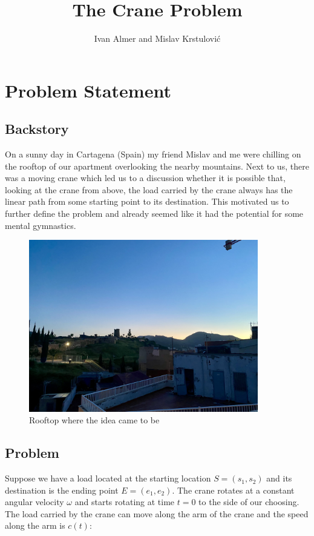 \documentclass[11pt]{article}
\begin{document}
\title{The Crane Problem}
\author{Ivan Almer and Mislav Krstulović}

\maketitle

\section{Problem Statement}

\subsection{Backstory}
On a sunny day in Cartagena (Spain) my friend Mislav and me were chilling on the rooftop of our apartment overlooking the nearby mountains. Next to us, there was a moving crane which led us to a discussion whether it is possible that, looking at the crane from above, the load carried by the crane always has the linear path from some starting point to its destination.
This motivated us to further define the problem and already seemed like it had the potential for some mental gymnastics.

\begin{figure}[H]
\centering
\includegraphics[width=10cm]{rooftop.jpeg}
\caption{Rooftop where the idea came to be}\label{fig:rooftop}
\end{figure}

\subsection{Problem}
Suppose we have a load located at the starting location $S = (s_1,s_2)$ and its destination is the ending point $E = (e_1,e_2)$. The crane rotates at a constant angular velocity $\omega$ and starts rotating at time $t=0$ to the side of our choosing. The load carried by the crane can move along the arm of the crane and the speed along the arm is $c(t)$:
\end{document}

